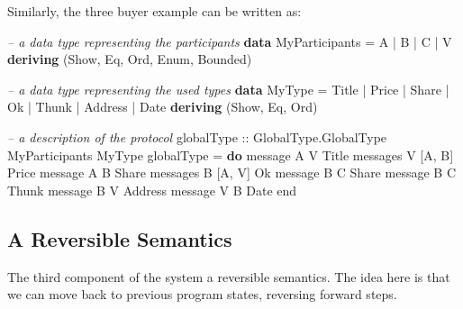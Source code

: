 \documentclass[runningheads,plain]{llncs}
\newenvironment{Shaded}{}{}
\newcommand{\KeywordTok}[1]{\textcolor[rgb]{0.00,0.44,0.13}{\textbf{#1}}}
\newcommand{\DataTypeTok}[1]{\textcolor[rgb]{0.56,0.13,0.00}{#1}}
\newcommand{\CommentTok}[1]{\textcolor[rgb]{0.38,0.63,0.69}{\textit{#1}}}
\newcommand{\OtherTok}[1]{\textcolor[rgb]{0.00,0.44,0.13}{#1}}
\newcommand{\FunctionTok}[1]{\textcolor[rgb]{0.02,0.16,0.49}{#1}}
\newcommand{\NormalTok}[1]{#1}
\begin{document}
Similarly, the three buyer example can be written as:

\begin{Shaded}
\begin{Highlighting}[]
\CommentTok{-- a data type representing the participants}
\KeywordTok{data} \DataTypeTok{MyParticipants} \FunctionTok{=} \DataTypeTok{A} \FunctionTok{|} \DataTypeTok{B} \FunctionTok{|} \DataTypeTok{C} \FunctionTok{|} \DataTypeTok{V} 
    \KeywordTok{deriving}\NormalTok{ (}\DataTypeTok{Show}\NormalTok{, }\DataTypeTok{Eq}\NormalTok{, }\DataTypeTok{Ord}\NormalTok{, }\DataTypeTok{Enum}\NormalTok{, }\DataTypeTok{Bounded}\NormalTok{)}

\CommentTok{-- a data type representing the used types }
\KeywordTok{data} \DataTypeTok{MyType} \FunctionTok{=} \DataTypeTok{Title} \FunctionTok{|} \DataTypeTok{Price} \FunctionTok{|} \DataTypeTok{Share} \FunctionTok{|} \DataTypeTok{Ok} \FunctionTok{|} \DataTypeTok{Thunk} \FunctionTok{|} \DataTypeTok{Address} \FunctionTok{|} \DataTypeTok{Date}
    \KeywordTok{deriving}\NormalTok{ (}\DataTypeTok{Show}\NormalTok{, }\DataTypeTok{Eq}\NormalTok{, }\DataTypeTok{Ord}\NormalTok{)}

\CommentTok{-- a description of the protocol}
\OtherTok{globalType ::} \DataTypeTok{GlobalType.GlobalType} \DataTypeTok{MyParticipants} \DataTypeTok{MyType}
\NormalTok{globalType }\FunctionTok{=} \KeywordTok{do} 
\NormalTok{    message }\DataTypeTok{A} \DataTypeTok{V} \DataTypeTok{Title} 
\NormalTok{    messages }\DataTypeTok{V}\NormalTok{ [}\DataTypeTok{A}\NormalTok{, }\DataTypeTok{B}\NormalTok{] }\DataTypeTok{Price} 
\NormalTok{    message }\DataTypeTok{A} \DataTypeTok{B} \DataTypeTok{Share} 
\NormalTok{    messages }\DataTypeTok{B}\NormalTok{ [}\DataTypeTok{A}\NormalTok{, }\DataTypeTok{V}\NormalTok{] }\DataTypeTok{Ok} 
\NormalTok{    message }\DataTypeTok{B} \DataTypeTok{C} \DataTypeTok{Share}
\NormalTok{    message }\DataTypeTok{B} \DataTypeTok{C} \DataTypeTok{Thunk}
\NormalTok{    message }\DataTypeTok{B} \DataTypeTok{V} \DataTypeTok{Address}
\NormalTok{    message }\DataTypeTok{V} \DataTypeTok{B} \DataTypeTok{Date}
\NormalTok{    end}
\end{Highlighting}
\end{Shaded}

\subsection{A Reversible Semantics}\label{a-reversible-semantics}

The third component of the system a reversible semantics. The idea here
is that we can move back to previous program states, reversing forward
steps.
\end{document}
